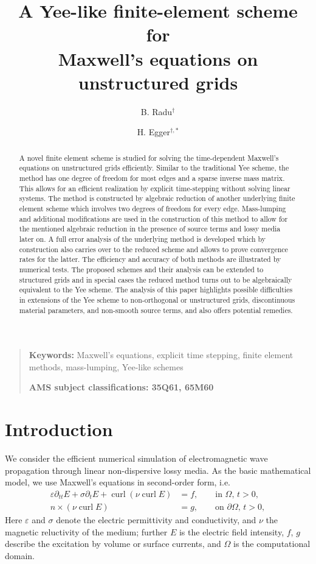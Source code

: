 \documentclass[12pt,reqno,a4paper]{amsart}
\title[A Yee-like scheme on unstructured grids]{A Yee-like finite-element scheme for \\ Maxwell's equations on unstructured grids}
\author{B. Radu$^\dag$ \and H. Egger$^{\dag,*}$}
\theoremstyle{definition}
\def\dt{\partial_{t}}
\def\dtt{\partial_{tt}}
\def\curl{\operatorname{curl}}
\def\E{{E}}
\def\eps{\varepsilon}
\begin{document}
\begin{abstract}
A novel finite element scheme is studied for solving the time-dependent Maxwell's equations on unstructured grids efficiently. Similar to the traditional Yee scheme, the method has one degree of freedom for most edges and a sparse inverse mass matrix. This allows for an efficient realization by explicit time-stepping without solving linear systems. 
The method is constructed by algebraic reduction of another underlying finite element scheme which involves two degrees of freedom for every edge. Mass-lumping and additional modifications are used in the construction of this method to allow for the mentioned algebraic reduction in the presence of source terms and lossy media later on. 
A full error analysis of the underlying method is developed which by construction also  carries over to the reduced scheme and allows to prove convergence rates for the latter. 
The efficiency and accuracy of both methods are illustrated by numerical tests. 
The proposed schemes and their analysis can be extended to structured grids and in special cases the reduced method turns out to be algebraically equivalent to the Yee scheme. 
The analysis of this paper highlights possible difficulties in extensions of the Yee scheme to non-orthogonal or unstructured grids, discontinuous material parameters, and non-smooth source terms, and also offers potential remedies.
\end{abstract}

\maketitle

\begin{quote}
\noindent
{\small {\bf Keywords:} 
Maxwell's equations, explicit time stepping, finite element methods, mass-lumping, Yee-like schemes}

\smallskip 
\noindent
{\small {\bf AMS subject classifications: 35Q61, 65M60} 
}
\end{quote}



\section{Introduction}
\label{sec:intro}

We consider the efficient numerical simulation of electromagnetic wave propagation through linear non-dispersive lossy media. As the basic mathematical model, we use Maxwell's equations in second-order form, i.e. 
\begin{align} 
\eps \dtt \E + \sigma \dt \E + \curl(\nu \curl \E) &= f,  \qquad \text{in }\Omega, \, t>0, \label{eq:maxwell1} \\
n \times (\nu \curl E) &= g, \qquad \text{on } \partial\Omega, \, t>0, \label{eq:maxwell2}
\end{align}
Here $\eps$ and $\sigma$ denote the electric permittivity and conductivity, and $\nu$ the magnetic reluctivity of the medium; further $E$ is the electric field intensity,  $f$, $g$ describe the excitation by volume or surface currents, and $\Omega$ is the computational domain.
\end{document}
